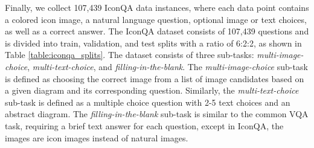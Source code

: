 \documentclass{article}
\begin{document}
Finally, we collect 107,439 IconQA data instances, where each data point contains a colored icon image, a natural language question, optional image or text choices, as well as a correct answer. The IconQA dataset consists of 107,439 questions and is divided into train, validation, and test splits with a ratio of 6:2:2, as shown in Table \ref{table:iconqa_splits}. The dataset consists of three sub-tasks: \textit{multi-image-choice}, \textit{multi-text-choice}, and \textit{filling-in-the-blank}. The \textit{multi-image-choice} sub-task is defined as choosing the correct image from a list of image candidates based on a given diagram and its corresponding question. Similarly, the \textit{multi-text-choice} sub-task is defined as a multiple choice question with 2-5 text choices and an abstract diagram. The \textit{filling-in-the-blank} sub-task is similar to the common VQA task, requiring a brief text answer for each question, except in IconQA, the images are icon images instead of natural images. 
\end{document}
